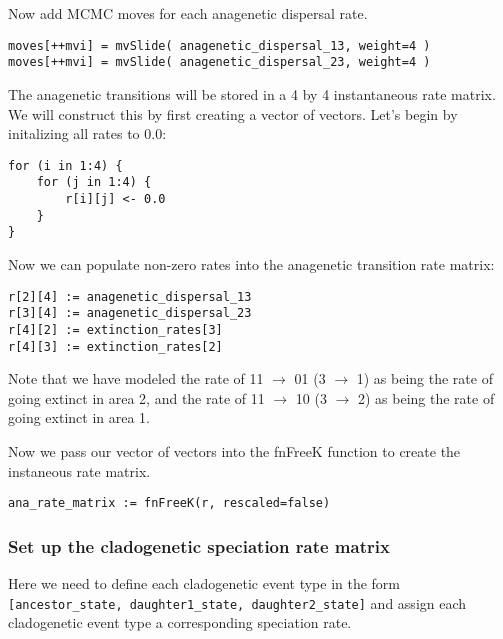 Now add MCMC moves for each anagenetic dispersal rate.
{\tt \begin{snugshade*}
\begin{lstlisting}
moves[++mvi] = mvSlide( anagenetic_dispersal_13, weight=4 )
moves[++mvi] = mvSlide( anagenetic_dispersal_23, weight=4 )
\end{lstlisting}
\end{snugshade*}}

The anagenetic transitions will be stored in a 4 by 4
instantaneous rate matrix. We will construct this by
first creating a vector of vectors. Let's begin by 
initalizing all rates to 0.0:
{\tt \begin{snugshade*}
\begin{lstlisting}
for (i in 1:4) {
    for (j in 1:4) {
        r[i][j] <- 0.0
    }
}
\end{lstlisting}
\end{snugshade*}}

Now we can populate non-zero rates into the anagenetic transition rate matrix:
{\tt \begin{snugshade*}
\begin{lstlisting}
r[2][4] := anagenetic_dispersal_13
r[3][4] := anagenetic_dispersal_23
r[4][2] := extinction_rates[3]
r[4][3] := extinction_rates[2]
\end{lstlisting}
\end{snugshade*}}
Note that we have modeled the rate of 11 $\rightarrow$ 01 (3 $\rightarrow$ 1) as being
the rate of going extinct in area 2, and the rate of 11 $\rightarrow$ 10 (3 $\rightarrow$ 2) 
as being the rate of going extinct in area 1. 

Now we pass our vector of vectors into the fnFreeK function to create
the instaneous rate matrix.
{\tt \begin{snugshade*}
\begin{lstlisting}
ana_rate_matrix := fnFreeK(r, rescaled=false)
\end{lstlisting}
\end{snugshade*}}

\subsubsection{Set up the cladogenetic speciation rate matrix}

Here we need to define each cladogenetic event type in the form
\texttt{[ancestor\_state, daughter1\_state, daughter2\_state]}
and assign each cladogenetic event type a corresponding 
speciation rate.

